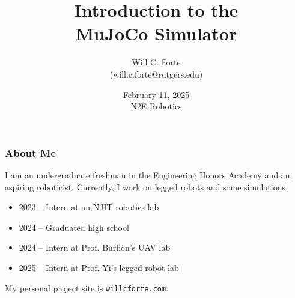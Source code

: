 \documentclass[14pt]{beamer}
\begin{document}
	\author[Will C. Forte]{Will C. Forte\\ (will.c.forte@rutgers.edu)}
	\title{Introduction to the\\ MuJoCo Simulator}
	\date[February 11, 2025]{February 11, 2025\\ N2E Robotics}
	\begin{frame}[plain]
		\maketitle
	\end{frame}
	
	\begin{frame}
		\frametitle{About Me}
		
		I am an undergraduate freshman in the Engineering Honors Academy and an aspiring roboticist. Currently, I work on legged robots and some simulations.
		\vspace{0.6cm}
		
		\begin{itemize}
			\item 2023 -- Intern at an NJIT robotics lab
			\item 2024 -- Graduated high school
			\item 2024 -- Intern at Prof. Burlion's UAV lab
			\item 2025 -- Intern at Prof. Yi's legged robot lab
		\end{itemize}

		\vspace{0.6cm}
		
		My personal project site is \texttt{willcforte.com}.
	\end{frame}
	
\end{document}
